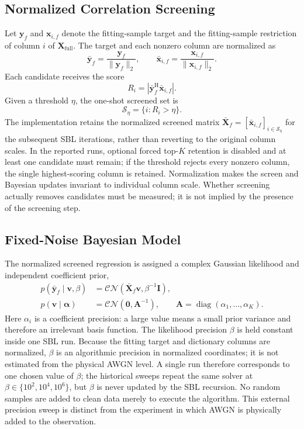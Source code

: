 \documentclass[conference]{IEEEtran}
\newcommand{\CN}{\mathcal{CN}}
\newcommand{\vect}[1]{\boldsymbol{#1}}
\newcommand{\mat}[1]{\mathbf{#1}}
\newcommand{\herm}{\mathrm{H}}
\newcommand{\diag}{\operatorname{diag}}
\begin{document}
\subsection{Normalized Correlation Screening}
Let $\mat y_f$ and $\mat x_{i,f}$ denote the fitting-sample target and the fitting-sample restriction of column $i$ of $\mat X_{\mathrm{full}}$. The target and each nonzero column are normalized as
\begin{equation}
 \bar{\mat y}_f=\frac{\mat y_f}{\|\mat y_f\|_2},\qquad
 \bar{\mat x}_{i,f}=\frac{\mat x_{i,f}}{\|\mat x_{i,f}\|_2}.
 \label{eq:normalize}
\end{equation}
Each candidate receives the score
\begin{equation}
 R_i=\left|\bar{\mat y}_f^{\herm}\bar{\mat x}_{i,f}\right|.
 \label{eq:corr}
\end{equation}
Given a threshold $\eta$, the one-shot screened set is
\begin{equation}
 \mathcal S_{\eta}=\{i:R_i>\eta\}.
 \label{eq:screen}
\end{equation}
The implementation retains the normalized screened matrix $\bar{\mat X}_f=[\bar{\mat x}_{i,f}]_{i\in\mathcal S_{\eta}}$ for the subsequent SBL iterations, rather than reverting to the original column scales. In the reported runs, optional forced top-$K$ retention is disabled and at least one candidate must remain; if the threshold rejects every nonzero column, the single highest-scoring column is retained. Normalization makes the screen and Bayesian updates invariant to individual column scale. Whether screening actually removes candidates must be measured; it is not implied by the presence of the screening step.

\subsection{Fixed-Noise Bayesian Model}
The normalized screened regression is assigned a complex Gaussian likelihood and independent coefficient prior,
\begin{align}
 p(\bar{\mat y}_f\mid\mat v,\beta)
   &=\CN(\bar{\mat X}_f\mat v,\beta^{-1}\mat I), \\
 p(\mat v\mid\vect\alpha)
   &=\CN(\mat 0,\mat A^{-1}),\qquad
     \mat A=\diag(\alpha_1,\ldots,\alpha_K).
 \label{eq:priors}
\end{align}
Here $\alpha_i$ is a coefficient precision: a large value means a small prior variance and therefore an irrelevant basis function. The likelihood precision $\beta$ is held constant inside one SBL run. Because the fitting target and dictionary columns are normalized, $\beta$ is an algorithmic precision in normalized coordinates; it is not estimated from the physical AWGN level. A single run therefore corresponds to one chosen value of $\beta$; the historical sweeps repeat the same solver at $\beta\in\{10^2,10^4,10^6\}$, but $\beta$ is never updated by the SBL recursion. No random samples are added to clean data merely to execute the algorithm. This external precision sweep is distinct from the experiment in which AWGN is physically added to the observation.
\end{document}
